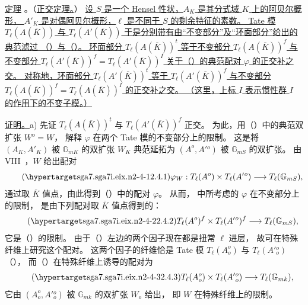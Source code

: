 \medskip
\noindent
\underline{定理} 。（\underline{正交定理。}）
\underline{设 $S$ 是一个 Hensel 性状，$A_K$ 是其分式域 $K$ 上的阿贝尔概形，
$A'_K$ 是对偶阿贝尔概形，$\ell$ 是不同于 $S$ 的剩余特征的素数。
Tate 模 $T_\ell(A(\overline K))$ 与 $T_\ell(A'(\overline K))$
于是分别带有由“不变部分”及“环面部分”给出的典范滤过
（）与（）。
环面部分 $T_\ell(A(\overline K))^t$ 等于不变部分 $T_\ell(A(\overline K))^f$
与不变部分 $T_\ell(A'(\overline K))^f=T_\ell(A'(\overline K))^I$
关于（）的典范配对 $\varphi$ 的正交补之交。
对称地，环面部分 $T_\ell(A'(\overline K))^t$ 等于 $T_\ell(A'(\overline K))^f$
与不变部分 $T_\ell(A(\overline K))^f=T_\ell(A(\overline K))^I$ 的正交补之交。
（这里，上标 $I$ 表示惯性群 $I$ 的作用下的不变子模。）}

\smallskip
\noindent
\underline{证明。}\quad a) 先证 $T_\ell(A(\overline K))^t$ 与 $T_\ell(A'(\overline K))^f$ 正交。
为此，用（）中的典范双扩张 $W^o=W$，
解释 $\varphi$ 在两个 Tate 模的不变部分上的限制。
这是将 $(A_K,A'_K)$ 被 $\mathbb G_{mK}$ 的双扩张 $W_K$
典范延拓为 $(A^o,A'{}^o)$ 被 $\mathbb G_{mS}$ 的双扩张。
由 VIII~，$W$ 给出配对
\begin{equation}\tag{\SGARefTarget{sga7.sga7i.eix.n2-4-1}{2.4.1}}
 \varphi_W:T_\ell(A^o)\times T_\ell(A'{}^o)
 \longrightarrow T_\ell(\mathbb G_{mS}),
\end{equation}
通过取 $\overline K$ 值点，由此得到（）中的配对 $\varphi$。
从而， 中所考虑的 $\varphi$ 在不变部分上的限制，
是由下列配对取 $\overline K$ 值点得到的：
\begin{equation}\tag{\SGARefTarget{sga7.sga7i.eix.n2-4-2}{2.4.2}}
 T_\ell(A^o)^f\times T_\ell(A'{}^o)^f
 \longrightarrow T_\ell(\mathbb G_{mS}),
\end{equation}
它是（）的限制。
由于（）左边的两个因子现在都是扭常 $\ell$ 进层，
故可在特殊纤维上研究这个配对。
这两个因子的纤维恰是 Tate 模 $T_\ell(A_o^o)$ 与 $T_\ell(A'{}_o^o)$
（），
而（）在特殊纤维上诱导的配对为
\begin{equation}\tag{\SGARefTarget{sga7.sga7i.eix.n2-4-3}{2.4.3}}
 T_\ell(A_o^o)\times T_\ell(A'{}_o^o)
 \longrightarrow T_\ell(\mathbb G_{mk}),
\end{equation}
它由 $(A_o^o,A'{}_o^o)$ 被 $\mathbb G_{mk}$ 的双扩张 $W_o$ 给出，
即 $W$ 在特殊纤维上的限制。

